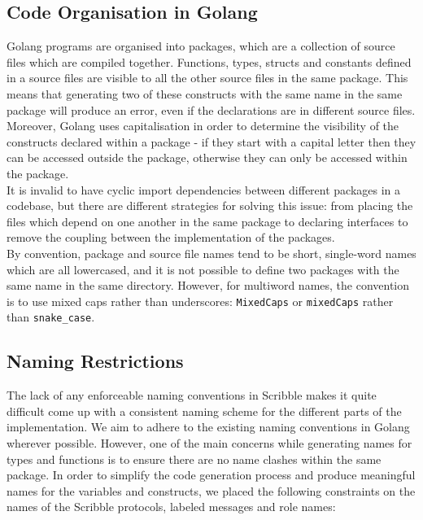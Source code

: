 \documentclass[12pt,twoside]{report}
\begin{document}
\subsection{Code Organisation in Golang}

Golang programs are organised into packages, which are a collection of source files which are compiled together. Functions, types, structs and constants defined in a source files are visible to all the other source files in the same package\cite{godocs}. This means that generating two of these constructs with the same name in the same package will produce an error, even if the declarations are in different source files. Moreover, Golang uses capitalisation in order to determine the visibility of the constructs declared within a package - if they start with a capital letter then they can be accessed outside the package, otherwise they can only be accessed within the package.\\

It is invalid to have cyclic import dependencies between different packages in a codebase, but there are different strategies for solving this issue: from placing the files which depend on one another in the same package to declaring interfaces to remove the coupling between the implementation of the packages.\\

By convention, package and source file names tend to be short, single-word names which are all lowercased, and it is not possible to define two packages with the same name in the same directory. However, for multiword names, the convention is to use mixed caps rather than underscores: \texttt{MixedCaps} or \texttt{mixedCaps} rather than \texttt{snake\_case}.\\

\subsection{Naming Restrictions}

The lack of any enforceable naming conventions in Scribble makes it quite difficult come up with a consistent naming scheme for the different parts of the implementation. We aim to adhere to the existing naming conventions in Golang wherever possible. However, one of the main concerns while generating names for types and functions is to ensure there are no name clashes within the same package. In order to simplify the code generation process and produce meaningful names for the variables and constructs, we placed the following constraints on the names of the Scribble protocols, labeled messages and role names:
\end{document}
